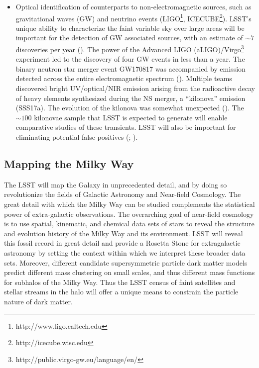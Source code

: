 \begin{itemize}
\item Optical identification of counterparts to non-electromagnetic
  sources, such as gravitational waves (GW) and neutrino events
  (LIGO\footnote{http://www.ligo.caltech.edu},
  ICECUBE\footnote{http://icecube.wisc.edu}).  LSST's unique ability
  to characterize the faint variable sky over large areas will be
  important for the detection of GW associated sources, with an estimate
  of $\sim 7$ discoveries per year (\cite{2017arXiv171005845S}).  The power
  of the Advanced LIGO (aLIGO)/Virgo\footnote{http://public.virgo-gw.eu/language/en/} experiment led to the discovery
  of four GW events in less than a year. The binary
  neutron star merger event GW170817 was accompanied by emission
  detected across the entire electromagnetic spectrum (\cite{Abbott2017}).
  Multiple teams discovered bright UV/optical/NIR emission
  arising from the radioactive decay of heavy elements synthesized
  during the NS merger, a ``kilonova'' emission (SSS17a).  The
  evolution of the kilonova was somewhat unexpected (\cite{Abbott2017}).
  The ${\sim100}$ kilonovae sample that LSST is expected to
  generate will enable comparative studies of these transients. LSST
  will also be important for eliminating potential false positives
  (\cite{2013ApJ...767..124N}; \cite{2012ApJ...746...48M}).

\end{itemize}


\subsection{Mapping the Milky Way }

The LSST will map the Galaxy in unprecedented detail, and by doing so revolutionize the fields of Galactic
Astronomy and Near-field Cosmology. The great detail with which the Milky Way can be studied complements
the statistical power of extra-galactic observations.  The overarching goal of near-field cosmology is to use
spatial, kinematic, and chemical data sets of stars to reveal the structure and evolution history of the Milky Way
and its environment. LSST will reveal this fossil record in great detail and provide a Rosetta Stone for extragalactic
astronomy by setting the context within which we interpret these
broader data sets. Moreover, different candidate supersymmetric
particle dark matter models predict different mass clustering on small
scales, and thus different mass functions for subhalos of the Milky
Way.  Thus the LSST census of faint satellites and stellar streams in
the halo will offer a unique means to constrain the
particle nature of dark matter.


